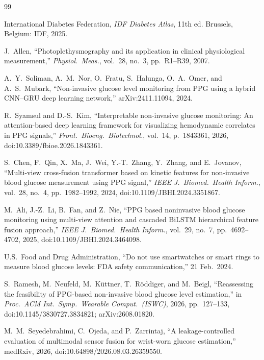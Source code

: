 \begin{thebibliography}{99}

International Diabetes Federation, \emph{IDF Diabetes Atlas}, 11th ed.
Brussels, Belgium: IDF, 2025.

J.~Allen, ``Photoplethysmography and its application in clinical
physiological measurement,'' \emph{Physiol.\ Meas.}, vol.~28, no.~3,
pp.~R1--R39, 2007.

A.~Y.~Soliman, A.~M.~Nor, O.~Fratu, S.~Halunga, O.~A.~Omer, and A.~S.~Mubark,
``Non-invasive glucose level monitoring from PPG using a hybrid CNN--GRU
deep learning network,'' arXiv:2411.11094, 2024.

R.~Syamsul and D.-S.~Kim, ``Interpretable non-invasive glucose monitoring: An
attention-based deep learning framework for visualizing hemodynamic
correlates in PPG signals,'' \emph{Front.\ Bioeng.\ Biotechnol.}, vol.~14,
p.~1843361, 2026, doi:10.3389/fbioe.2026.1843361.

S.~Chen, F.~Qin, X.~Ma, J.~Wei, Y.-T.~Zhang, Y.~Zhang, and E.~Jovanov,
``Multi-view cross-fusion transformer based on
kinetic features for non-invasive blood glucose measurement using PPG
signal,'' \emph{IEEE J.\ Biomed.\ Health Inform.}, vol.~28, no.~4,
pp.~1982--1992, 2024, doi:10.1109/JBHI.2024.3351867.

M.~Ali, J.-Z.~Li, B.~Fan, and Z.~Nie, ``PPG based noninvasive blood glucose monitoring using
multi-view attention and cascaded BiLSTM hierarchical feature fusion
approach,'' \emph{IEEE J.\ Biomed.\ Health Inform.}, vol.~29, no.~7,
pp.~4692--4702, 2025, doi:10.1109/JBHI.2024.3464098.

U.S.\ Food and Drug Administration, ``Do not use smartwatches or smart rings
to measure blood glucose levels: FDA safety communication,'' 21 Feb.\ 2024.

S.~Ramesh, M.~Neufeld, M.~K\"uttner, T.~R\"oddiger, and M.~Beigl,
``Reassessing the feasibility of PPG-based non-invasive blood glucose level
estimation,'' in \emph{Proc.\ ACM Int.\ Symp.\ Wearable Comput.\ (ISWC)},
2026, pp.~127--133, doi:10.1145/3830727.3834821; arXiv:2608.01820.

M.~M.~Seyedebrahimi, C.~Ojeda, and P.~Zarrintaj, ``A leakage-controlled
evaluation of multimodal sensor fusion for wrist-worn glucose estimation,''
medRxiv, 2026, doi:10.64898/2026.08.03.26359550.


\end{thebibliography}
